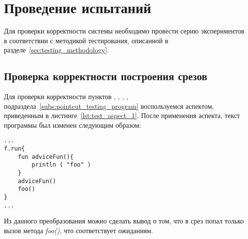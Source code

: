 \section{Проведение испытаний}
\label{sec:testing_run}
Для проверки корректности системы необходимо провести серию экспериментов в соответствии с методикой тестирования, описанной в разделе~\ref{sec:testing_methodology}.
\subsection{Проверка корректности построения срезов}
\label{sub:pointcut_building_tests}
Для проверки корректности пунктов
\quotes{\ref{list:method_name_check}},
\quotes{\ref{list:class_name_check}},
\quotes{\ref{list:method_params_check}},
\quotes{\ref{list:call_check}},
\quotes{\ref{list:reference_pointcut_check}} подраздела~\ref{subs:pointcut_testing_program} воспользуемся аспектом, приведенным в листинге~\ref{lst:test_aspect_1}.
После применения аспекта, текст программы был изменен следующим образом:
\begin{lstlisting}[style={java}, label={lst:result_of_weaving_1_1},
 caption={Результат применения аспекта, описанного в листинге~\ref{lst:test_aspect_1}, к тестовой программе}]
...
f.run{
	fun adviceFun(){
		println ( "foo" )
	}
	adviceFun()
	foo()
}
...
\end{lstlisting}
Из данного преобразования можно сделать вывод о том, что в срез попал только вызов метода \textit{foo()}, что соответствует ожиданиям.

